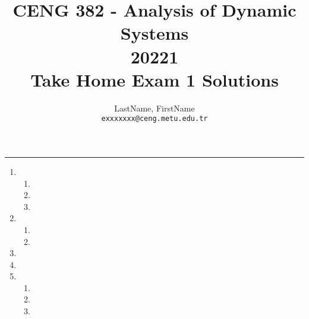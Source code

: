 \documentclass[12pt,a4paper, margin=1in]{article}
\author{
  LastName, FirstName\\
  \texttt{exxxxxxx@ceng.metu.edu.tr}
}
\title{CENG 382 - Analysis of Dynamic Systems \\
20221\\
Take Home Exam 1 Solutions}
\begin{document}
\maketitle

\noindent\rule{19cm}{1.2pt}

\begin{enumerate}

    \item %
        \begin{enumerate}
            \item 
            \item 
            \item 
        \end{enumerate}
        
        
    \item %
        \begin{enumerate}
            \item 
            \item 
        \end{enumerate}
        
        
    \item %
        
        
    \item %
        
        
    \item %
        \begin{enumerate}
            \item 
            \item 
            \item 
        \end{enumerate}

\end{enumerate}
\end{document}

